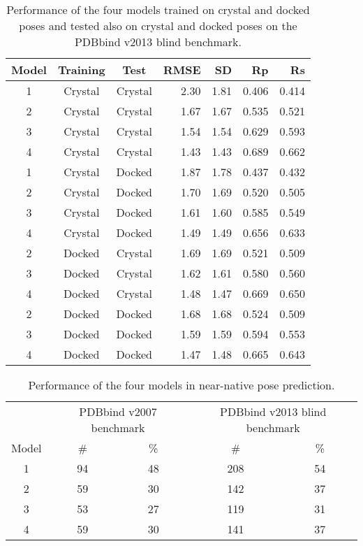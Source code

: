 \documentclass[twocolumn]{bmcart}
\begin{document}
\begin{backmatter}
\begin{table}[ht]
\caption{Performance of the four models trained on crystal and docked poses and tested also on crystal and docked poses on the PDBbind v2013 blind benchmark.}
\label{rescoring2:tbl-set-2-pdbbind-2012}
\begin{tabular}{cccrrrr}
\hline
Model & Training & Test & RMSE & SD & Rp & Rs\\
\hline
1 & Crystal & Crystal & 2.30 & 1.81 & 0.406 & 0.414\\
2 & Crystal & Crystal & 1.67 & 1.67 & 0.535 & 0.521\\
3 & Crystal & Crystal & 1.54 & 1.54 & 0.629 & 0.593\\
4 & Crystal & Crystal & 1.43 & 1.43 & 0.689 & 0.662\\
\hline
1 & Crystal & Docked  & 1.87 & 1.78 & 0.437 & 0.432\\
2 & Crystal & Docked  & 1.70 & 1.69 & 0.520 & 0.505\\
3 & Crystal & Docked  & 1.61 & 1.60 & 0.585 & 0.549\\
4 & Crystal & Docked  & 1.49 & 1.49 & 0.656 & 0.633\\
\hline
2 & Docked  & Crystal & 1.69 & 1.69 & 0.521 & 0.509\\
3 & Docked  & Crystal & 1.62 & 1.61 & 0.580 & 0.560\\
4 & Docked  & Crystal & 1.48 & 1.47 & 0.669 & 0.650\\
\hline
2 & Docked  & Docked  & 1.68 & 1.68 & 0.524 & 0.509\\
3 & Docked  & Docked  & 1.59 & 1.59 & 0.594 & 0.553\\
4 & Docked  & Docked  & 1.47 & 1.48 & 0.665 & 0.643\\
\hline
\end{tabular}
\end{table}

\begin{table}[ht]
\caption{Performance of the four models in near-native pose prediction.}
\label{rescoring2:near-native}
\begin{tabular}{ccccc}
\hline
& \multicolumn{2}{c}{PDBbind v2007 benchmark} & \multicolumn{2}{c}{PDBbind v2013 blind benchmark}\\
Model & \# & \% & \# & \%\\
\hline
1 & 94 & 48 & 208 & 54\\
2 & 59 & 30 & 142 & 37\\
3 & 53 & 27 & 119 & 31\\
4 & 59 & 30 & 141 & 37\\
\hline
\end{tabular}
\end{table}


\end{backmatter}
\end{document}

